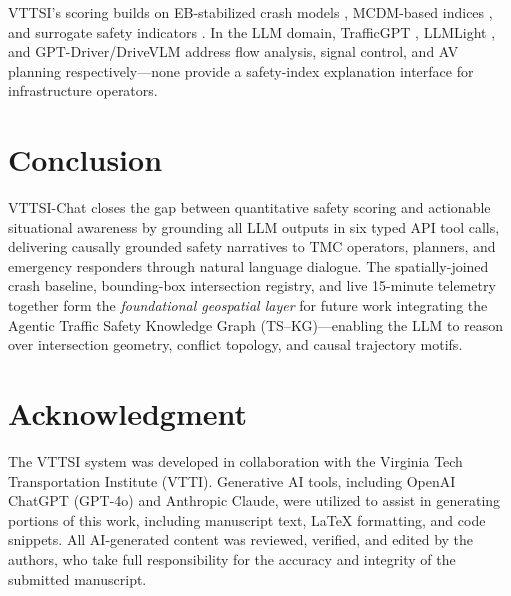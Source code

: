 \documentclass[conference]{IEEEtran}
\begin{document}
VTTSI's scoring builds on EB-stabilized crash models
\cite{persaud2007,montella2020systemic}, MCDM-based indices
\cite{Amraji2025CombinedSafetyIndex,asadamraji2025combined}, and surrogate safety
indicators \cite{schultz2025_surrogate,gettman2003ssam}.
In the LLM domain, TrafficGPT \cite{trafficgpt2023}, LLMLight \cite{llmlight2024},
and GPT-Driver/DriveVLM \cite{gptdriver2023,drivevlm2024} address flow analysis,
signal control, and AV planning respectively---none provide a safety-index explanation
interface for infrastructure operators.

\section{Conclusion}
\label{sec:conclusion}

VTTSI-Chat closes the gap between quantitative safety scoring and actionable
situational awareness by grounding all LLM outputs in six typed API tool calls,
delivering causally grounded safety narratives to TMC operators, planners, and
emergency responders through natural language dialogue.
The spatially-joined crash baseline, bounding-box intersection registry, and live
15-minute telemetry together form the \emph{foundational geospatial layer} for future
work integrating the Agentic Traffic Safety Knowledge Graph (TS--KG)---enabling the
LLM to reason over intersection geometry, conflict topology, and causal trajectory
motifs.

\section*{Acknowledgment}
The VTTSI system was developed in collaboration with the Virginia Tech Transportation
Institute (VTTI).
Generative AI tools, including OpenAI ChatGPT (GPT-4o) and Anthropic Claude, were
utilized to assist in generating portions of this work, including manuscript text,
LaTeX formatting, and code snippets.
All AI-generated content was reviewed, verified, and edited by the authors, who take
full responsibility for the accuracy and integrity of the submitted manuscript.

\printbibliography
\end{document}
